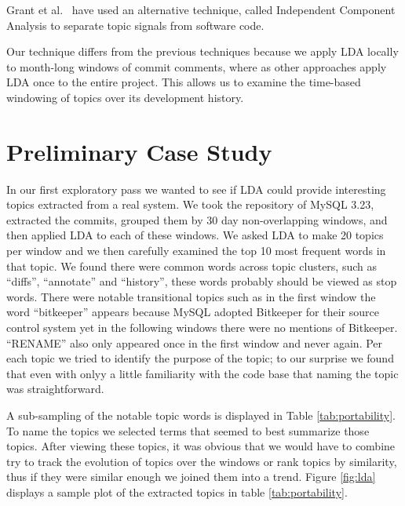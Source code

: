 \documentclass[times, 10pt,twocolumn]{article}
\begin{document}
Grant et al.~\cite{scottcordy} have used an alternative technique,
 called Independent Component Analysis to
separate topic signals from software code. 

Our technique differs from the previous techniques because we apply
LDA locally to month-long windows of commit comments, where as other
approaches apply LDA once to the entire project. This allows us to
examine the time-based windowing of topics over its development
history.




\section{Preliminary Case Study}

In our first exploratory pass we wanted to see if LDA could provide
interesting topics extracted from a real system. We took the
repository of MySQL 3.23, extracted the commits, grouped them by 30
day non-overlapping windows, and then applied LDA to each of these
windows. We asked LDA to make 20 topics per window and we then
carefully examined the top 10 most frequent words in that topic.  We
found there were common words across topic clusters, such as
``diffs'', ``annotate'' and ``history'', these words probably should
be viewed as stop words. There were notable transitional topics such
as in the first window the word ``bitkeeper'' appears because MySQL
adopted Bitkeeper for their source control system yet in the following
windows there were no mentions of Bitkeeper. ``RENAME'' also only
appeared once in the first window and never again. Per each topic we
tried to identify the purpose of the topic; to our surprise we found
that even with onlyy a little familiarity with the code base that
naming the topic was straightforward.

A sub-sampling of the notable topic words is displayed in Table
\ref{tab:portability}.  To name the topics we selected terms that
seemed to best summarize those topics.  After viewing these topics, it was
obvious that we would have to combine try to track the evolution of
topics over the windows or rank topics by similarity, thus if they
were similar enough we joined them into a trend. Figure \ref{fig:lda}
displays a sample plot of the extracted topics in table
\ref{tab:portability}.
\end{document}
